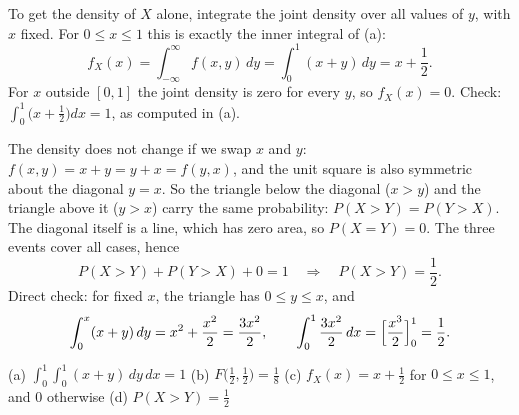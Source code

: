\begin{solution}
	 To get the density of $X$ alone, integrate the joint density over all
	values of $y$, with $x$ fixed. For $0\le x\le1$ this is exactly the inner
	integral of (a):
	\[ f_X(x)=\int_{-\infty}^{\infty}f(x,y)\,dy=\int_0^1(x+y)\,dy=x+\frac12. \]
	For $x$ outside $[0,1]$ the joint density is zero for every $y$, so
	$f_X(x)=0$. Check: $\int_0^1\bigl(x+\frac12\bigr)dx=1$, as computed in (a).

	 The density does not change if we swap $x$ and $y$:
	$f(x,y)=x+y=y+x=f(y,x)$, and the unit square is also symmetric about the
	diagonal $y=x$. So the triangle below the diagonal ($x>y$) and the triangle
	above it ($y>x$) carry the same probability: $P(X>Y)=P(Y>X)$. The diagonal
	itself is a line, which has zero area, so $P(X=Y)=0$. The three events cover
	all cases, hence
	\[ P(X>Y)+P(Y>X)+0=1 \quad\Longrightarrow\quad P(X>Y)=\frac12. \]
	Direct check: for fixed $x$, the triangle has $0\le y\le x$, and
	\[ \int_0^x(x+y)\,dy=x^2+\frac{x^2}{2}=\frac{3x^2}{2},\qquad
		\int_0^1\frac{3x^2}{2}\,dx=\Bigl[\frac{x^3}{2}\Bigr]_0^1=\frac12. \]
	\begin{answer}
		(a) $\int_0^1\!\int_0^1(x+y)\,dy\,dx=1$
		\quad (b) $F\bigl(\frac12,\frac12\bigr)=\frac18$
		\quad (c) $f_X(x)=x+\frac12$ for $0\le x\le1$, and $0$ otherwise
		\quad (d) $P(X>Y)=\frac12$
	\end{answer}
\end{solution}
